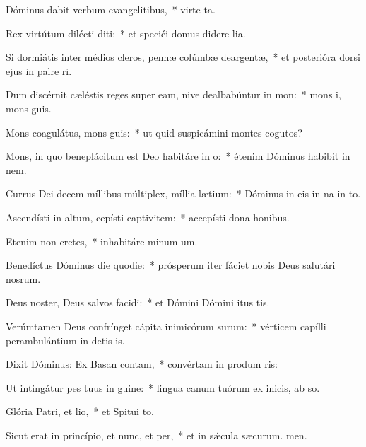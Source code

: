 \item Dóminus dabit verbum evangelitibus,~* virte ta.
\item Rex virtútum dilécti diti:~* et speciéi domus didere lia.
\item Si dormiátis inter médios cleros, pennæ colúmbæ deargentæ,~* et posterióra dorsi ejus in palre ri.
\item Dum discérnit cæléstis reges super eam, nive dealbabúntur in mon:~* mons i, mons guis.
\item Mons coagulátus, mons guis:~* ut quid suspicámini montes cogutos?
\item Mons, in quo beneplácitum est Deo habitáre in o:~* étenim Dóminus habibit in nem.
\item Currus Dei decem míllibus múltiplex, míllia lætium:~* Dóminus in eis in na in to.
\item Ascendísti in altum, cepísti captivitem:~* accepísti dona  honibus.
\item Etenim non cretes,~* inhabitáre minum um.
\item Benedíctus Dóminus die quodie:~* prósperum iter fáciet nobis Deus salutári nosrum.
\item Deus noster, Deus salvos facidi:~* et Dómini Dómini itus tis.
\item Verúmtamen Deus confrínget cápita inimicórum surum:~* vérticem capílli perambulántium in detis is.
\item Dixit Dóminus: Ex Basan contam,~* convértam in produm ris:
\item Ut intingátur pes tuus in guine:~* lingua canum tuórum ex inicis, ab so.
\item Glória Patri, et lio,~* et Spitui to.
\item Sicut erat in princípio, et nunc, et per,~* et in sǽcula sæcurum. men.
